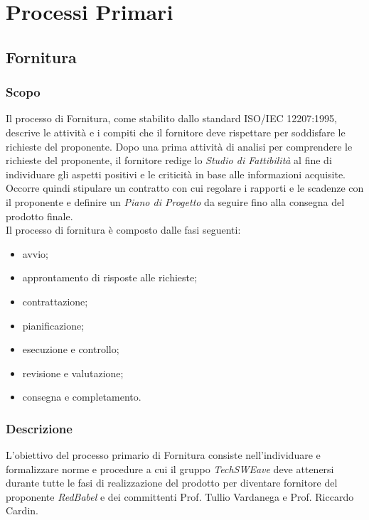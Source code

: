 \section{Processi Primari}
\subsection{Fornitura}
\subsubsection{Scopo}
Il processo di Fornitura, come stabilito dallo standard ISO/IEC 12207:1995, descrive le attività e i compiti che il fornitore deve rispettare per soddisfare le richieste del proponente. Dopo una prima attività di analisi per comprendere le richieste del proponente, il fornitore redige lo \textit{Studio di Fattibilità} al fine di individuare gli aspetti positivi e le criticità in base alle informazioni acquisite. Occorre quindi stipulare un contratto con cui regolare i rapporti e le scadenze con il proponente e definire un \textit{Piano di Progetto} da seguire fino alla consegna del prodotto finale.
\\Il processo di fornitura è composto dalle fasi seguenti:
\begin{itemize}
    \item avvio;
    \item approntamento di risposte alle richieste;
    \item contrattazione;
    \item pianificazione;
    \item esecuzione e controllo;
    \item revisione e valutazione;
    \item consegna e completamento.
\end{itemize}
\subsubsection{Descrizione}
L’obiettivo del processo primario di Fornitura consiste nell’individuare e formalizzare norme e procedure a cui il gruppo \textit{TechSWEave} deve attenersi durante tutte le fasi di realizzazione del prodotto per diventare fornitore del proponente \textit{RedBabel} e dei committenti Prof. Tullio Vardanega e Prof. Riccardo Cardin. 
